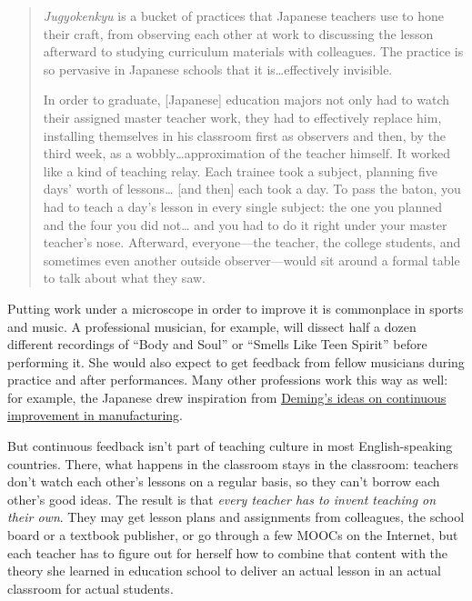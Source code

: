 \begin{quote}

\emph{Jugyokenkyu} is a bucket of practices that Japanese teachers use to
hone their craft, from observing each other at work to discussing the
lesson afterward to studying curriculum materials with colleagues. The
practice is so pervasive in Japanese schools that it
is{\ldots}effectively invisible.

In order to graduate, {[}Japanese{]} education majors not only had to
watch their assigned master teacher work, they had to effectively
replace him, installing themselves in his classroom first as
observers and then, by the third week, as a wobbly{\ldots}approximation
of the teacher himself. It worked like a kind of teaching
relay. Each trainee took a subject, planning five days' worth of
lessons{\ldots} {[}and then{]} each took a day. To pass the baton, you had to
teach a day's lesson in every single subject: the one you planned
and the four you did not{\ldots} and you had to do it right under your
master teacher's nose. Afterward, everyone---the teacher, the
college students, and sometimes even another outside
observer---would sit around a formal table to talk about what they
saw.

\end{quote}

Putting work under a microscope in order to improve it is commonplace
in sports and music. A professional musician, for example, will
dissect half a dozen different recordings of ``Body and Soul'' or
``Smells Like Teen Spirit'' before performing it. She would also expect
to get feedback from fellow musicians during practice and after
performances. Many other professions work this way as well: for
example, the Japanese drew inspiration from \href{https://en.wikipedia.org/wiki/W.\_Edwards\_Deming}{Deming's ideas on
continuous improvement in manufacturing}.

But continuous feedback isn't part of teaching culture in most
English-speaking countries. There, what happens in the classroom stays
in the classroom: teachers don't watch each other's lessons on a
regular basis, so they can't borrow each other's good ideas. The
result is that \emph{every teacher has to invent teaching on their
own}. They may get lesson plans and assignments from colleagues, the
school board or a textbook publisher, or go through a few MOOCs on the
Internet, but each teacher has to figure out for herself how to
combine that content with the theory she learned in education school
to deliver an actual lesson in an actual classroom for actual
students.

